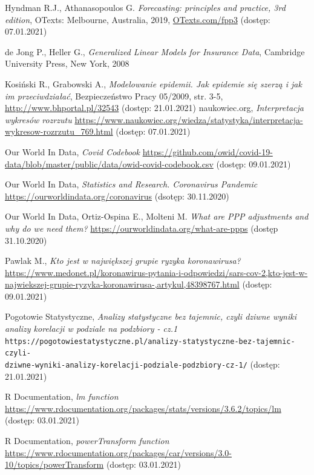 \documentclass[12pt]{mwbk}
\theoremstyle{plain}
\theoremstyle{definition}
\theoremstyle{definition}
\begin{document}
\begin{thebibliography}{99}
 Hyndman R.J.,  Athanasopoulos G. \emph{Forecasting: principles and practice, 3rd edition}, OTexts: Melbourne, Australia, 2019, \url{OTexts.com/fpp3} (dostęp: 07.01.2021)

 de Jong P., Heller G., \emph{Generalized Linear Models for Insurance Data}, Cambridge University Press, New York, 2008

 Kosiński R., Grabowski A., \emph{Modelowanie epidemii. Jak epidemie się szerzą i jak im przeciwdziałać}, Bezpieczeństwo Pracy 05/2009, str. 3-5, \url{http://www.bhportal.pl/32543} (dostęp: 21.01.2021)
\newpage
{} naukowiec.org, \emph{Interpretacja wykresów rozrzutu} \url{https://www.naukowiec.org/wiedza/statystyka/interpretacja-wykresow-rozrzutu_769.html} (dostęp: 07.01.2021)

 Our World In Data, \emph{Covid Codebook} \url{https://github.com/owid/covid-19-data/blob/master/public/data/owid-covid-codebook.csv} (dostęp: 09.01.2021)

 Our World In Data, \emph{Statistics and Research. Coronavirus Pandemic} \url{https://ourworldindata.org/coronavirus} (dsotęp: 30.11.2020)

 Our World In Data, Ortiz-Ospina E., Molteni M. \emph{What are PPP adjustments and why do we need them?} \url{https://ourworldindata.org/what-are-ppps} (dostęp 31.10.2020)

 Pawlak M., \emph{Kto jest w największej grupie ryzyka koronawirusa?} \url{https://www.medonet.pl/koronawirus-pytania-i-odpowiedzi/sars-cov-2,kto-jest-w-najwiekszej-grupie-ryzyka-koronawirusa-,artykul,48398767.html} (dostęp: 09.01.2021)

 Pogotowie Statystyczne, \emph{Analizy statystyczne bez tajemnic, czyli dziwne wyniki analizy korelacji w podziale na podzbiory - cz.1}  \texttt{https://pogotowiestatystyczne.pl/analizy-statystyczne-bez-tajemnic-czyli-\\dziwne-wyniki-analizy-korelacji-podziale-podzbiory-cz-1/} (dostęp: 21.01.2021)

 R Documentation, \emph{lm function} \url{https://www.rdocumentation.org/packages/stats/versions/3.6.2/topics/lm} (dostęp: 03.01.2021)

 R Documentation, \emph{powerTransform function} \url{https://www.rdocumentation.org/packages/car/versions/3.0-10/topics/powerTransform} (dostęp: 03.01.2021)


\end{thebibliography}
\end{document}
